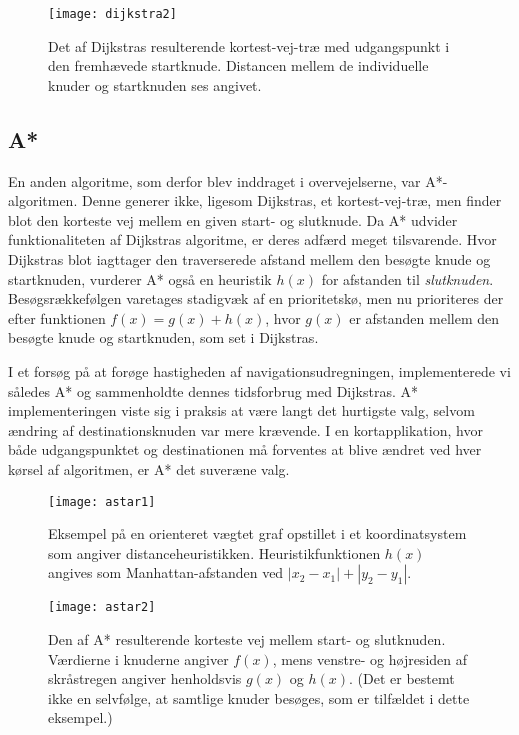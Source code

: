 \begin{figure}[ht]
	\centering
  \texttt{[image: dijkstra2]}
  \captionsetup{width=0.8\textwidth}
  \caption{Det af Dijkstras resulterende kortest-vej-træ med udgangspunkt i den fremhævede startknude. Distancen mellem de individuelle knuder og startknuden ses angivet.}
  \label{fig:dijkstra2}
\end{figure}

\subsection{A*}
\label{subsec:astar}
En anden algoritme, som derfor blev inddraget i overvejelserne, var A*-algoritmen. Denne generer ikke, ligesom Dijkstras, et kortest-vej-træ, men finder blot den korteste vej mellem en given start- og slutknude. Da A* udvider funktionaliteten af Dijkstras algoritme, er deres adfærd meget tilsvarende. Hvor Dijkstras blot iagttager den traverserede afstand mellem den besøgte knude og startknuden, vurderer A* også en heuristik $h(x)$ for afstanden til \emph{slutknuden}. Besøgsrækkefølgen varetages stadigvæk af en prioritetskø, men nu prioriteres der efter funktionen $f(x)=g(x)+h(x)$, hvor $g(x)$ er afstanden mellem den besøgte knude og startknuden, som set i Dijkstras.

I et forsøg på at forøge hastigheden af navigationsudregningen, implementerede vi således A* og sammenholdte dennes tidsforbrug med Dijkstras. A* implementeringen viste sig i praksis at være langt det hurtigste valg, selvom ændring af destinationsknuden var mere krævende. I en kortapplikation, hvor både udgangspunktet og destinationen må forventes at blive ændret ved hver kørsel af algoritmen, er A* det suveræne valg.

\begin{figure}[ht]
	\centering
  \texttt{[image: astar1]}
  \captionsetup{width=0.8\textwidth}
	\caption{Eksempel på en orienteret vægtet graf opstillet i et koordinatsystem som angiver distanceheuristikken. Heuristikfunktionen $h(x)$ angives som Manhattan-afstanden ved $|x_2-x_1|+|y_2-y_1|$.}
  \label{fig:astar1}
\end{figure}

\begin{figure}[ht]
	\centering
  \texttt{[image: astar2]}
  \captionsetup{width=0.8\textwidth}
	\caption{Den af A* resulterende korteste vej mellem start- og slutknuden. Værdierne i knuderne angiver $f(x)$, mens venstre- og højresiden af skråstregen angiver henholdsvis $g(x)$ og $h(x)$. (Det er bestemt ikke en selvfølge, at samtlige knuder besøges, som er tilfældet i dette eksempel.)}
  \label{fig:astar2}
\end{figure}

